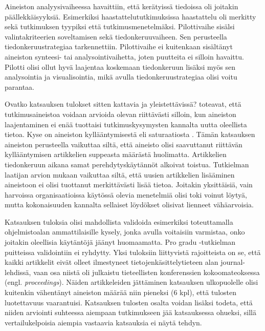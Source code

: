 \documentclass[utf8]{gradu3}
\begin{document}
Aineiston analyysivaiheessa havaittiin, että kerätyissä tiedoissa oli joitakin päällekkäisyyksiä. Esimerkiksi haastattelututkimuksissa haastattelu oli merkitty sekä tutkimuksen tyypiksi että tutkimusmenetelmäksi. Pilottivaihe sisälsi valintakriteerien soveltamisen sekä tiedonkeruuvaiheen. Sen perusteella tiedonkeruustrategiaa tarkennettiin. Pilottivaihe ei kuitenkaan sisältänyt aineiston synteesi- tai analysointivaihetta, joten puutteita ei silloin havaittu. Pilotti olisi ollut hyvä laajentaa koskemaan tiedonkeruun lisäksi myös sen analysointia ja visualisointia, mikä avulla tiedonkeruustrategiaa olisi voitu parantaa.

Ovatko katsauksen tulokset sitten kattavia ja yleistettävissä? \textcite{eskola-suoranta-1998} toteavat, että tutkimusaineistoa voidaan arvioida olevan riittävästi silloin, kun aineiston laajentaminen ei enää tuottaisi tutkimuskysymysten kannalta uutta oleellista tietoa. Kyse on aineiston kyllääntymisestä eli saturaatiosta \parencite{eskola-suoranta-1998}. Tämän katsauksen aineiston perusteella vaikuttaa siltä, että aineisto olisi saavuttanut riittävän kyllääntymisen artikkelien suppeasta määrästä huolimatta. Artikkelien tiedonkeruun aikana samat perehdytyskäytännöt alkoivat toistua. Tutkielman laatijan arvion mukaan vaikuttaa siltä, että uusien artikkelien lisääminen aineistoon ei olisi tuottanut merkittävästi lisää tietoa. Joitakin yksittäisiä, vain harvoissa organisaatioissa käytössä olevia menetelmiä olisi toki voinut löytyä, mutta kokonaisuuden kannalta sellaiset löydökset olisivat lienneet vähäarvoisia.

Katsauksen tuloksia olisi mahdollista validoida esimerkiksi toteuttamalla ohjelmistoalan ammattilaisille kysely, jonka avulla voitaisiin varmistaa, onko joitakin oleellisia käytäntöjä jäänyt huomaamatta. Pro gradu -tutkielman puitteissa validointiin ei ryhdytty. Yksi tuloksiin liittyvistä rajoitteista on se, että kaikki artikkelit eivät olleet ilmestyneet tietojenkäsittelytieteen alan journal-lehdissä, vaan osa niistä oli julkaistu tieteellisten konferenssien kokoomateoksessa (engl. \textit{proceedings}). Näiden artikkeleiden jättäminen katsauksen ulkopuolelle olisi kuitenkin vähentänyt aineiston määrää niin pieneksi (6 kpl), että tulosten luotettavuus vaarantuisi. Katsauksen tulosten osalta voidan lisäksi todeta, että niiden arviointi suhteessa aiempaan tutkimukseen jää katsauksessa ohueksi, sillä vertailukelpoisia aiempia vastaavia katsauksia ei näytä tehdyn.
\end{document}
